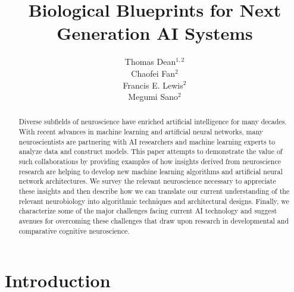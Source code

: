 \documentclass[letterpaper,11pt]{article}
\title{Biological Blueprints for Next Generation AI Systems}
\date{}
\author{Thomas Dean$^{1,2}$\\
Chaofei Fan$^{2}$\\
Francis E. Lewis$^{2}$\\
Megumi Sano$^{2}$}\footnotextnonum{Affiliations: $^{1}$Brown University, $^{2}$Stanford University}
\begin{document}




\begin{titlepage}

  \maketitle

  \begin{abstract}
% 
    Diverse subfields of neuroscience have enriched artificial intelligence for many decades. With recent advances in machine learning and artificial neural networks, many neuroscientists are partnering with AI researchers and machine learning experts to analyze data and construct models. This paper attempts to demonstrate the value of such collaborations by providing examples of how insights derived from neuroscience research are helping to develop new machine learning algorithms and artificial neural network architectures. We survey the relevant neuroscience necessary to appreciate these insights and then describe how we can translate our current understanding of the relevant neurobiology into algorithmic techniques and architectural designs. Finally, we characterize some of the major challenges facing current AI technology and suggest avenues for overcoming these challenges that draw upon research in developmental and comparative cognitive neuroscience.
%
  \end{abstract}

\end{titlepage}

\newpage


\tableofcontents

\newpage





\section{Introduction}
\end{document}
